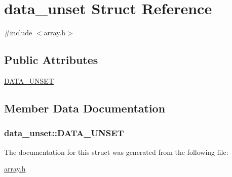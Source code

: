 \hypertarget{structdata__unset}{\section{data\-\_\-unset Struct Reference}
\label{structdata__unset}
}


{\ttfamily \#include $<$array.\-h$>$}

\subsection*{Public Attributes}
\begin{DoxyCompactItemize}
\item 
\hyperlink{structdata__unset_adac6751ca8a894bf8d65cc90f549e12d}{D\-A\-T\-A\-\_\-\-U\-N\-S\-E\-T}
\end{DoxyCompactItemize}


\subsection{Member Data Documentation}
\hypertarget{structdata__unset_adac6751ca8a894bf8d65cc90f549e12d}{
\subsubsection[{D\-A\-T\-A\-\_\-\-U\-N\-S\-E\-T}]{\setlength{\rightskip}{0pt plus 5cm}data\-\_\-unset\-::\-D\-A\-T\-A\-\_\-\-U\-N\-S\-E\-T}}\label{structdata__unset_adac6751ca8a894bf8d65cc90f549e12d}


The documentation for this struct was generated from the following file\-:\begin{DoxyCompactItemize}
\item 
\hyperlink{array_8h}{array.\-h}\end{DoxyCompactItemize}
